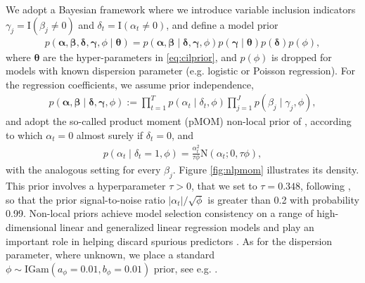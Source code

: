 \documentclass[12pt]{article}
\newcommand{\balpha}{{\bm{\alpha}}}
\newcommand{\bbeta}{{\bm{\beta}}}
\newcommand{\bgamma}{{\bm{\gamma}}}
\newcommand{\bdelta}{{\bm{\delta}}}
\newcommand{\btheta}{{\bm{\theta}}}
\begin{document}
We adopt a Bayesian framework where we   introduce variable inclusion indicators   $\gamma_{j} = \text{I}(\beta_{j} \neq 0)$ and $\delta_{t} = \text{I}(\alpha_{t} \neq 0)$, and define a model prior 
\begin{align}
p(\balpha, \bbeta, \bdelta, \bgamma, \phi \mid \btheta) = p(\balpha, \bbeta \mid \bdelta, \bgamma, \phi) p(\bgamma \mid \btheta) p(\bdelta) p(\phi), \label{eq:probmodel}
\end{align}
where $\btheta $ are the hyper-parameters in \eqref{eq:cilprior}, and $p(\phi)$ is dropped for models with known dispersion parameter (e.g. logistic or Poisson regression). For the regression coefficients, we assume prior independence, %
\begin{align*}
p(\balpha, \bbeta \mid \bdelta, \bgamma, \phi) := \prod_{t=1}^{T} p(\alpha_{t} \mid \delta_{t}, \phi) \prod_{j=1}^{J} p(\beta_{j} \mid \gamma_{j}, \phi),
\end{align*}
and adopt the so-called product moment (pMOM) non-local prior of \cite{Johnson12}, according to which $\alpha_{t} = 0$ almost surely if $\delta_{t} = 0$, and
\begin{align*}
p(\alpha_{t} \mid \delta_{t} = 1, \phi) = \frac{\alpha_{t}^{2}}{\tau \phi} \text{N}(\alpha_{t}; 0, \tau \phi),
\end{align*}
with the analogous setting for every $\beta_{j}$. Figure \ref{fig:nlpmom} illustrates its density.
This prior involves a hyperparameter $\tau > 0$, that we set to $\tau = 0.348$, following \cite{Johnson10}, so that the prior signal-to-noise ratio $|\alpha_t|/\sqrt{\phi}$ is greater than 0.2 with probability 0.99. Non-local priors achieve model selection consistency on a range of high-dimensional linear and generalized linear regression models and play an important role in helping discard spurious predictors \citep{Johnson12, wu2016nonlocal, Shin18, Rossell21}. As for the dispersion parameter, where unknown,  we place a standard $\phi \sim \text{IGam}(a_{\phi} = 0.01, b_{\phi} = 0.01)$ prior, %
see e.g. \cite{Gelman06}.
\end{document}
